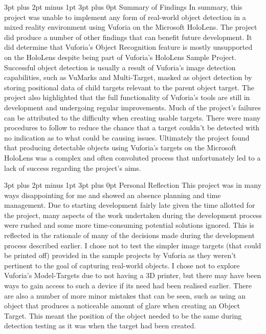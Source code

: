 \documentclass[12pt,a4paper,oneside]{article}
\makeatletter
\renewcommand\subsubsection{\@startsection {subsubsection}{1}{0mm} %
	                           {3pt plus 2pt minus 1pt} %
	                           {3pt plus 0pt} %
	                           {\normalfont\bfseries}}
\renewcommand\subsection{\@startsection {subsection}{1}{0mm} %
                               {3pt plus 2pt minus 1pt} %
                               {3pt plus 0pt} %
                               {\large\bfseries}}
\makeatother
\begin{document}
\subsubsection{Summary of Findings}
In summary, this project was unable to implement any form of real-world object detection in a mixed reality environment using Vuforia on the Microsoft HoloLens. The project did produce a number of other findings that can benefit future development. It did determine that Vuforia's Object Recognition feature is mostly unsupported on the HoloLens despite being part of Vuforia's HoloLens Sample Project. Successful object detection is usually a result of Vuforia's image detection capabilities, such as VuMarks and Multi-Target, masked as object detection by storing positional data of child targets relevant to the parent object target. The project also highlighted that the full functionality of Vuforia's tools are still in development and undergoing regular improvements. Much of the project's failures can be attributed to the difficulty when creating usable targets. There were many procedures to follow to reduce the chance that a target couldn't be detected with no indication as to what could be causing issues. Ultimately the project found that producing detectable objects using Vuforia's targets on the Microsoft HoloLens was a complex and often convoluted process that unfortunately led to a lack of success regarding the project's aims.

\subsection{Personal Reflection}
This project was in many ways disappointing for me and showed an absence planning and time management. Due to starting development fairly late given the time allotted for the project, many aspects of the work undertaken during the development process were rushed and some more time-consuming potential solutions ignored. This is reflected in the rationale of many of the decisions made during the development process described earlier. I chose not to test the simpler image targets (that could be printed off) provided in the sample projects by Vuforia as they weren't pertinent to the goal of capturing real-world objects. I chose not to explore Vuforia's Model-Targets due to not having a 3D printer, but there may have been ways to gain access to such a device if its need had been realised earlier. There are also a number of more minor mistakes that can be seen, such as using an object that produces a noticeable amount of glare when creating an Object Target. This meant the position of the object needed to be the same during detection testing as it was when the target had been created.
\end{document}
